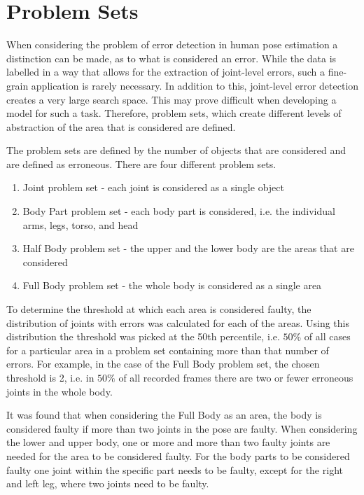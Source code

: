 \section{Problem Sets}
\label{sec:problem_set}

When considering the problem of error detection in human pose estimation a distinction can be made, as to what is considered an error. While the data is labelled in a way that allows for the extraction of joint-level errors, such a fine-grain application is rarely necessary. In addition to this, joint-level error detection creates a very large search space. This may prove difficult when developing a model for such a task. Therefore, problem sets, which create different levels of abstraction of the area that is considered are defined.

The problem sets are defined by the number of objects that are considered and are defined as erroneous. There are four different problem sets. 

\begin{enumerate}[label=(\Alph*)]
  \item Joint problem set - each joint is considered as a single object
  \item Body Part problem set - each body part is considered, i.e. the individual arms, legs, torso, and head
  \item Half Body problem set - the upper and the lower body are the areas that are considered
  \item Full Body problem set - the whole body is considered as a single area
\end{enumerate}

To determine the threshold at which each area is considered faulty, the distribution of joints with errors was calculated for each of the areas. Using this distribution the threshold was picked at the 50th percentile, i.e. $50\%$ of all cases for a particular area in a problem set containing more than that number of errors. For example, in the case of the Full Body problem set, the chosen threshold is 2, i.e. in $50\%$ of all recorded frames there are two or fewer erroneous joints in the whole body. 

It was found that when considering the Full Body as an area, the body is considered faulty if more than two joints in the pose are faulty. When considering the lower and upper body, one or more and more than two faulty joints are needed for the area to be considered faulty. For the body parts to be considered faulty one joint within the specific part needs to be faulty, except for the right and left leg, where two joints need to be faulty.


